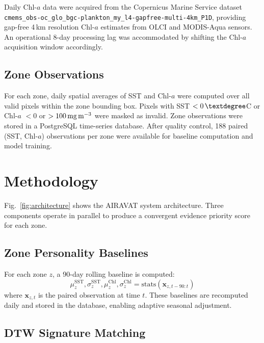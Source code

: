 \documentclass[journal]{IEEEtran}
\begin{document}
Daily Chl-$a$ data were acquired from the Copernicus Marine Service
dataset \texttt{cmems\_obs-oc\_glo\_bgc-plankton\_my\_l4-gapfree-multi-4km\_P1D},
providing gap-free 4\,km resolution Chl-$a$ estimates from OLCI and
MODIS-Aqua sensors. An operational 8-day processing lag was accommodated
by shifting the Chl-$a$ acquisition window accordingly.

\subsection{Zone Observations}

For each zone, daily spatial averages of SST and Chl-$a$ were computed
over all valid pixels within the zone bounding box. Pixels with SST
$< 0\,\textdegree$C or Chl-$a$ $< 0$ or $> 100\,\text{mg\,m}^{-3}$
were masked as invalid. Zone observations were stored in a PostgreSQL
time-series database. After quality control, 188 paired (SST, Chl-$a$)
observations per zone were available for baseline computation and
model training.

\section{Methodology}
\label{sec:method}

Fig.~\ref{fig:architecture} shows the AIRAVAT system architecture.
Three components operate in parallel to produce a convergent evidence
priority score for each zone.

\subsection{Zone Personality Baselines}

For each zone $z$, a 90-day rolling baseline is computed:
\begin{equation}
\mu_z^{\text{SST}}, \sigma_z^{\text{SST}},
\mu_z^{\text{Chl}}, \sigma_z^{\text{Chl}}
= \text{stats}\!\left(\mathbf{x}_{z,t-90:t}\right)
\label{eq:baseline}
\end{equation}
where $\mathbf{x}_{z,t}$ is the paired observation at time $t$.
These baselines are recomputed daily and stored in the database,
enabling adaptive seasonal adjustment.

\subsection{DTW Signature Matching}
\label{subsec:dtw}
\end{document}
